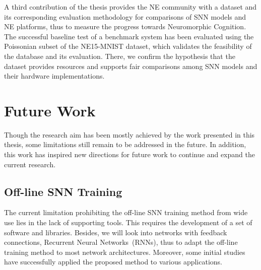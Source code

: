A third contribution of the thesis provides the NE community with a dataset and its corresponding evaluation methodology for comparisons of SNN models and NE platforms, thus to measure the progress towards Neuromorphic Cognition.
The successful baseline test of a benchmark system has been evaluated using the Poissonian subset of the NE15-MNIST dataset, which validates the feasibility of the database and its evaluation.
There, we confirm the hypothesis that the dataset provides resources and supports fair comparisons among SNN models and their hardware implementations.

%



\section{Future Work}
Though the research aim has been mostly achieved by the work presented in this thesis, some limitations still remain to be addressed in the future.
In addition, this work has inspired new directions for future work to continue and expand the current research.

\subsection{Off-line SNN Training}
The current limitation prohibiting the off-line SNN training method from wide use lies in the lack of supporting tools.
This requires the development of a set of software and libraries.
Besides, we will look into networks with feedback connections, Recurrent Neural Networks~(RNNs), thus to adapt the off-line training method to most network architectures.
Moreover, some initial studies \DIFaddbegin {}\DIFaddend have successfully applied the proposed method to various applications. 


